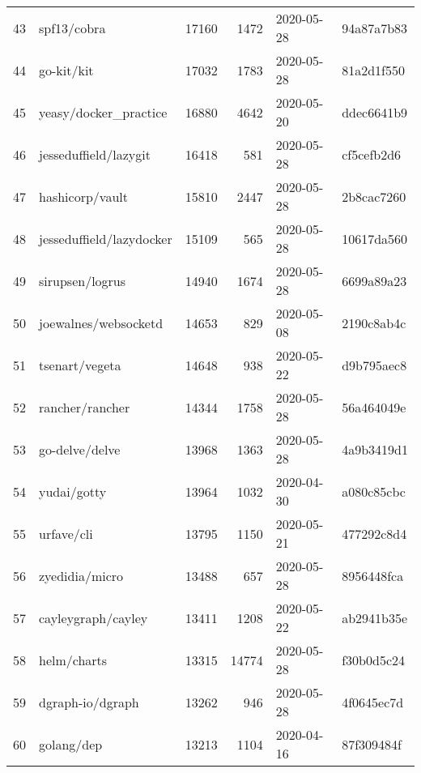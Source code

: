 \begin{longtable}{llrrll}
    43  &                                        spf13/cobra &  17160 &   1472 & 2020-05-28 &  94a87a7b83 \\
    44  &                                         go-kit/kit &  17032 &   1783 & 2020-05-28 &  81a2d1f550 \\
    45  &                              yeasy/docker\_practice &  16880 &   4642 & 2020-05-20 &  ddec6641b9 \\
    46  &                              jesseduffield/lazygit &  16418 &    581 & 2020-05-28 &  cf5cefb2d6 \\
    47  &                                    hashicorp/vault &  15810 &   2447 & 2020-05-28 &  2b8cac7260 \\
    48  &                           jesseduffield/lazydocker &  15109 &    565 & 2020-05-28 &  10617da560 \\
    49  &                                    sirupsen/logrus &  14940 &   1674 & 2020-05-28 &  6699a89a23 \\
    50  &                               joewalnes/websocketd &  14653 &    829 & 2020-05-08 &  2190c8ab4c \\
    51  &                                     tsenart/vegeta &  14648 &    938 & 2020-05-22 &  d9b795aec8 \\
    52  &                                    rancher/rancher &  14344 &   1758 & 2020-05-28 &  56a464049e \\
    53  &                                     go-delve/delve &  13968 &   1363 & 2020-05-28 &  4a9b3419d1 \\
    54  &                                        yudai/gotty &  13964 &   1032 & 2020-04-30 &  a080c85cbc \\
    55  &                                         urfave/cli &  13795 &   1150 & 2020-05-21 &  477292c8d4 \\
    56  &                                     zyedidia/micro &  13488 &    657 & 2020-05-28 &  8956448fca \\
    57  &                                 cayleygraph/cayley &  13411 &   1208 & 2020-05-22 &  ab2941b35e \\
    58  &                                        helm/charts &  13315 &  14774 & 2020-05-28 &  f30b0d5c24 \\
    59  &                                   dgraph-io/dgraph &  13262 &    946 & 2020-05-28 &  4f0645ec7d \\
    60  &                                         golang/dep &  13213 &   1104 & 2020-04-16 &  87f309484f \\

\end{longtable}
